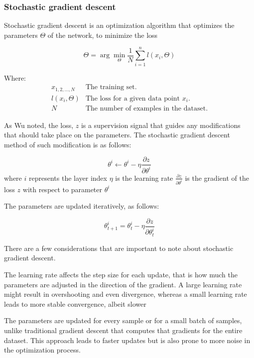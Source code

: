 		\bigskip
		\subsubsection{Stochastic gradient descent}
		
		Stochastic gradient descent is an optimization algorithm that optimizes the parameters $\Theta$ of the network, to minimize the loss
		
		$$
		\Theta = \arg \min_{\Theta}\frac{1}{N} \sum_{i=1}^{n}l(x_i, \Theta)
		$$

		Where:
		\[
		\begin{array}{ll}
			x_{1,2,\dots,N} & \text{The training set.} \\
			l(x_i, \Theta) & \text{The loss for a given data point } x_i. \\
			N & \text{The number of examples in the dataset.}
		\end{array}
		\]
		\bigskip
		
		As Wu noted\cite{wu2017introduction}, the loss, $z$ is a supervision signal that guides any modifications that should take place on the parameters. The stochastic gradient descent method of such modification is as follows:
		
		$$
		\theta^i\leftarrow \theta^i - \eta \frac{\partial z}{\partial \theta^i}
		$$
		where 
		$i$ represents the layer index
		$\eta$ is the learning rate
		$\frac{\partial z}{\partial \theta^i}$ is the gradient of the loss $z$ with respect to parameter $\theta^i$
		
		The parameters are updated iteratively,  as follows:
		
		$$
		\theta^i_{t+1} = \theta^i_{t} - \eta \frac{\partial z}{\partial \theta^i_{t}}
		$$
		
		There are a few considerations that are important to note about stochastic gradient descent.
		
		The learning rate affects the step size for each update, that is how much the parameters are adjusted in the direction of the gradient. A large learning rate might result in overshooting and even divergence, whereas a small learning rate leads to more stable convergence, albeit slower
		
		The parameters are updated for every sample or for a small batch of samples, unlike traditional gradient descent that computes that gradients for the entire dataset. This approach leads to faster updates but is also prone to more noise in the optimization process.
		
		
		
